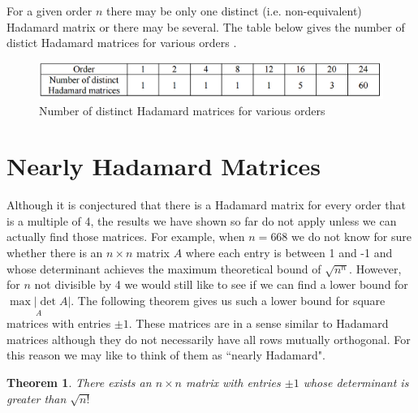 \documentclass{article}
\newtheorem{theorem}{Theorem}[section]
\theoremstyle{definition}
\begin{document}
For a given order $n$ there may be only one distinct (i.e. non-equivalent) Hadamard matrix or there may be several. The table below gives the number of distict Hadamard matrices for various orders \cite{orders}.
\begin{figure}[h!]
\caption{Number of distinct Hadamard matrices for various orders}
\centering
\includegraphics[width=1.3\textwidth]{table}
\end{figure}

\section{Nearly Hadamard Matrices}
Although it is conjectured that there is a Hadamard matrix for every order that is a multiple of 4, the results we have shown so far do not apply unless we can actually find those matrices. For example, when $n=668$ we do not know for sure whether there is an $n \times n$ matrix $A$ where each entry is between 1 and -1 and whose determinant achieves the maximum theoretical bound of $\sqrt {n^n}$. However, for $n$ not divisible by 4 we would still like to see if we can find a lower bound for $\underset{A}{\max |\det A|}$. The following theorem gives us such a lower bound for square matrices with entries $\pm 1$. These matrices are in a sense similar to Hadamard matrices although they do not necessarily have all rows mutually orthogonal. For this reason we may like to think of them as ``nearly Hadamard".

\begin{theorem}
There exists an $n \times n$ matrix with entries $\pm 1$ whose determinant is greater than $\sqrt{n!}$
\end{theorem}
\end{document}
